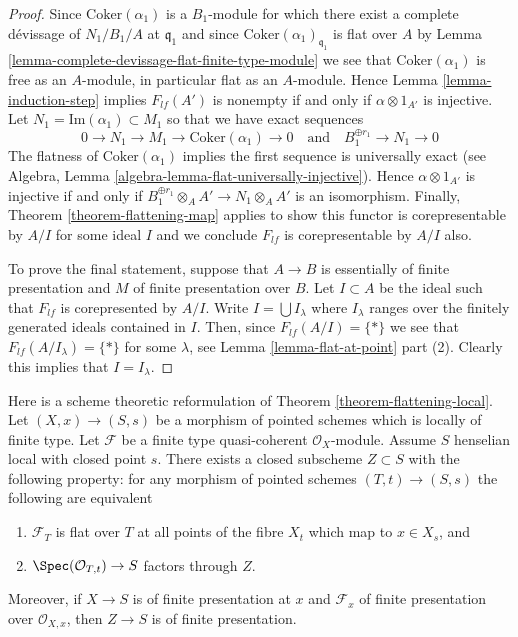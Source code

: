\begin{proof}
\medskip\noindent
Since $\text{Coker}(\alpha_1)$ is a $B_1$-module for which
there exist a complete d\'evissage of $N_1/B_1/A$ at $\mathfrak q_1$
and since $\text{Coker}(\alpha_1)_{\mathfrak q_1}$ is
flat over $A$ by
Lemma \ref{lemma-complete-devissage-flat-finite-type-module}
we see that $\text{Coker}(\alpha_1)$ is free as an $A$-module, in particular
flat as an $A$-module. Hence
Lemma \ref{lemma-induction-step}
implies $F_{lf}(A')$ is nonempty if and only if $\alpha \otimes 1_{A'}$
is injective. Let $N_1 = \text{Im}(\alpha_1) \subset M_1$ so that
we have exact sequences
$$
0 \to N_1 \to M_1 \to \text{Coker}(\alpha_1) \to 0
\quad\text{and}\quad
B_1^{\oplus r_1} \to N_1 \to 0
$$
The flatness of $\text{Coker}(\alpha_1)$ implies the first sequence
is universally exact (see
Algebra, Lemma \ref{algebra-lemma-flat-universally-injective}).
Hence $\alpha \otimes 1_{A'}$ is injective if and only if
$B_1^{\oplus r_1} \otimes_A A' \to N_1 \otimes_A A'$
is an isomorphism. Finally,
Theorem \ref{theorem-flattening-map}
applies to show this functor is corepresentable by $A/I$ for some ideal $I$
and we conclude $F_{lf}$ is corepresentable by $A/I$ also.

\medskip\noindent
To prove the final statement, suppose that $A \to B$ is essentially of finite
presentation and $M$ of finite presentation over $B$. Let $I \subset A$
be the ideal such that $F_{lf}$ is corepresented by $A/I$.
Write $I = \bigcup I_\lambda$ where $I_\lambda$ ranges over the finitely
generated ideals contained in $I$. Then, since $F_{lf}(A/I) = \{*\}$
we see that $F_{lf}(A/I_\lambda) = \{*\}$ for some $\lambda$, see
Lemma \ref{lemma-flat-at-point} part (2).
Clearly this implies that $I = I_\lambda$.
\end{proof}

\begin{remark}
\label{remark-flattening-local-scheme-theoretic}
Here is a scheme theoretic reformulation of
Theorem \ref{theorem-flattening-local}.
Let $(X, x) \to (S, s)$ be a morphism of pointed schemes
which is locally of finite type. Let $\mathcal{F}$ be a finite
type quasi-coherent $\mathcal{O}_X$-module.
Assume $S$ henselian local with closed point $s$.
There exists a closed subscheme $Z \subset S$ with the following property:
for any morphism of pointed schemes $(T, t) \to (S, s)$ the following
are equivalent
\begin{enumerate}
\item $\mathcal{F}_T$ is flat over $T$ at all points of the fibre
$X_t$ which map to $x \in X_s$, and
\item $\Spec(\mathcal{O}_{T, t}) \to S$ factors through $Z$.
\end{enumerate}
Moreover, if $X \to S$ is of finite presentation at $x$ and $\mathcal{F}_x$
of finite presentation over $\mathcal{O}_{X, x}$, then $Z \to S$
is of finite presentation.
\end{remark}

